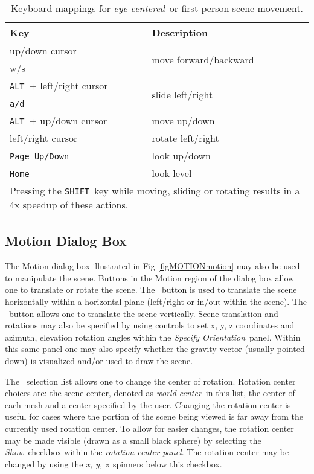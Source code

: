 \documentclass[11pt,twoside]{book}
\newcommand{\frameit}[1]{\fbox{\tt #1}}
\begin{document}
\begin{table}[bph]
\begin{center}
\caption{Keyboard mappings for {\em eye centered}\ or first person scene movement.}
\vspace{0.1in}
\begin{tabular}{|l|l|}
\hline Key &   Description  \\

\hline\hline
up/down cursor & \multirow{2}{*}{move forward/backward}\  \\
w/s &   \\\hline
{\tt ALT}\ + left/right cursor  & \multirow{2}{*}{slide left/right}\ \\
{\tt a/d}\  &  \\ \hline
{\tt ALT}\ + up/down cursor  & move up/down  \\ \hline\hline
left/right cursor  & rotate left/right \\ \hline
{\tt Page Up/Down}\  & look up/down \\ \hline
{\tt Home}\  & look level \\ \hline\hline
\multicolumn{2}{|p{3.5in}|}{Pressing the {\tt SHIFT}\ key while moving, sliding or rotating
results in a  4x speedup of these actions. }\ \\ \hline

\end{tabular}
\label{tabKEYS}
\end{center}
\end{table}

\subsection{Motion Dialog Box}
The Motion dialog box illustrated in Fig \ref{figMOTIONmotion} may also be used to manipulate the
scene. Buttons in the Motion
region of the dialog box allow one to translate or rotate the scene. The
\frameit{Horizontal}\ button is used to translate the scene
horizontally within a horizontal plane (left/right or in/out within the scene).  The
\frameit{Vertical}\ button allows one to translate the scene vertically.
Scene translation and rotations may also be specified by using controls to set x, y, z
coordinates and azimuth, elevation rotation angles within the {\em Specify Orientation}\ panel.
Within this same panel one may also specify whether the gravity vector (usually pointed down) is visualized and/or used to draw the scene.

The \frameit{Rotate about}\ selection list allows one to change the center of rotation.
Rotation center choices are: the scene center, denoted as {\em world center}\ in this list, the center of each mesh and a center specified by the user.
Changing the rotation center is useful for cases where the portion of the scene being viewed is far away from the currently used rotation center.
To allow for easier changes, the rotation center may be made visible (drawn as a small black sphere) by selecting the {\em Show}\ checkbox within the {\em rotation center panel}.  The rotation center may be changed by using the
{\em x, y, z}\ spinners below this checkbox.
\end{document}
